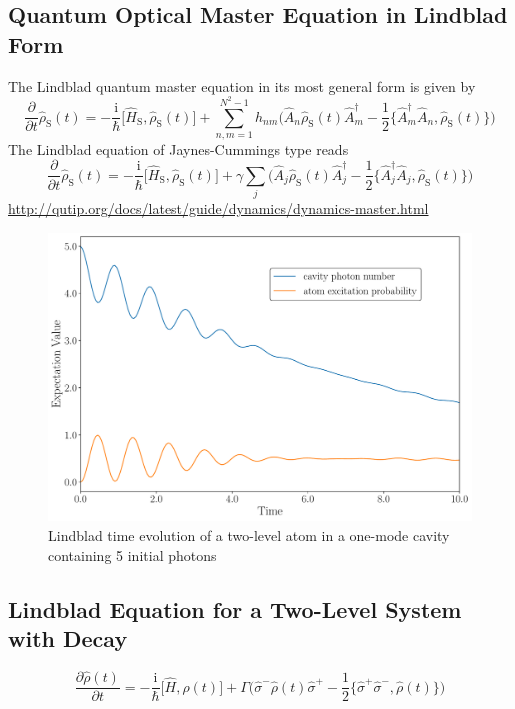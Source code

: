 \documentclass[9pt]{report}
\begin{document}
\subsection{Quantum Optical Master Equation in Lindblad Form}
The Lindblad quantum master equation in its most general form is given by
\begin{equation}
\frac{\partial}{\partial t}\hat{\rho}_{\mathrm{S}}(t) = -\frac{\mathrm{i}}{\hbar}\big[\hat{H}_{\mathrm{S}},\hat{\rho}_{\mathrm{S}}(t)\big]+\sum_{n,m=1}^{N^2-1}h_{nm}\Big(\hat{A}_{n}\hat{\rho}_{\mathrm{S}}(t)\hat{A}_{m}^{\dagger}-\frac{1}{2}\big\{\hat{A}_{m}^{\dagger}\hat{A}_{n},\hat{\rho}_{\mathrm{S}}(t)\big\}\Big)
\end{equation}
The Lindblad equation of Jaynes-Cummings type reads
\begin{equation}
\frac{\partial}{\partial t}\hat{\rho}_{\mathrm{S}}(t) = -\frac{\mathrm{i}}{\hbar}\big[\hat{H}_{\mathrm{S}},\hat{\rho}_{\mathrm{S}}(t)\big]+\gamma\sum_{j}\Big(\hat{A}_{j}\hat{\rho}_{\mathrm{S}}(t)\hat{A}_{j}^{\dagger}-\frac{1}{2}\big\{\hat{A}_{j}^{\dagger}\hat{A}_{j},\hat{\rho}_{\mathrm{S}}(t)\big\}\Big)
\end{equation}
\url{http://qutip.org/docs/latest/guide/dynamics/dynamics-master.html}
\begin{figure}[H]
	\centering
	\includegraphics[width=14cm]{Jaynes-Cummings-Dynamics.pdf}
	\caption{Lindblad time evolution of a two-level atom in a one-mode cavity containing 5 initial photons}
\end{figure}


\subsection{Lindblad Equation for a Two-Level System with Decay}
\begin{equation}
\frac{\partial\hat{\rho}(t)}{\partial t}=-\frac{\mathrm{i}}{\hbar}\big[\hat{H},\hat{\rho}(t)\big]+\Gamma\Big(\hat{\sigma}^{-}\hat{\rho}(t)\hat{\sigma}^{+}-\frac{1}{2}\big\{\hat{\sigma}^{+}\hat{\sigma}^{-},\hat{\rho}(t)\big\}\Big)
\end{equation}
\end{document}
